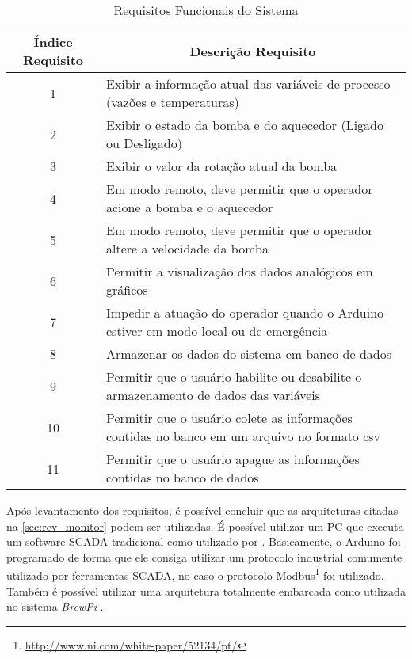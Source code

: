		\begin{table}[!htb]
			\centering
			\caption{Requisitos Funcionais do Sistema}
			\label{tbl1}
			\def\arraystretch{1.3}
			\begin{tabular}{c p{11cm}}
				\hline
				\multicolumn{1}{c}{\textbf{Índice Requisito}} & \multicolumn{1}{c}{\textbf{Descrição Requisito}} \\ \hline 
				1 & Exibir a informação atual das variáveis de processo (vazões e temperaturas) \\ %
				2 & Exibir o estado da bomba e do aquecedor (Ligado ou Desligado) \\ %
				3 & Exibir o valor da rotação atual da bomba \\ %
				4 & Em modo remoto, deve permitir que o operador acione a bomba e o aquecedor \\ %
				5 & Em modo remoto, deve permitir que o operador altere a velocidade da bomba \\ %
				6 & Permitir a visualização dos dados analógicos em gráficos \\ %
				7 & Impedir a atuação do operador quando o Arduino estiver em modo local ou de emergência \\ %
				8 & Armazenar os dados do sistema em banco de dados \\ %
				9 & Permitir que o usuário habilite ou desabilite o armazenamento de dados das variáveis \\ %
				10 & Permitir que o usuário colete as informações contidas no banco em um arquivo no formato csv \\ %
				11 & Permitir que o usuário apague as informações contidas no banco de dados \\ \hline
			\end{tabular}
		\end{table}
	
		Após levantamento dos requisitos, é possível concluir que as arquiteturas citadas na \autoref{sec:rev_monitor} podem ser utilizadas. É possível utilizar um PC que executa um software SCADA tradicional como utilizado por \textcite{alexandre2015}. Basicamente, o Arduino foi programado de forma que ele consiga utilizar um protocolo industrial comumente utilizado por ferramentas SCADA, no caso o protocolo Modbus\footnote{\url{http://www.ni.com/white-paper/52134/pt/}} foi utilizado. Também é possível utilizar uma arquitetura totalmente embarcada como utilizada no sistema \textit{BrewPi} \cite{brewpi}.
	
